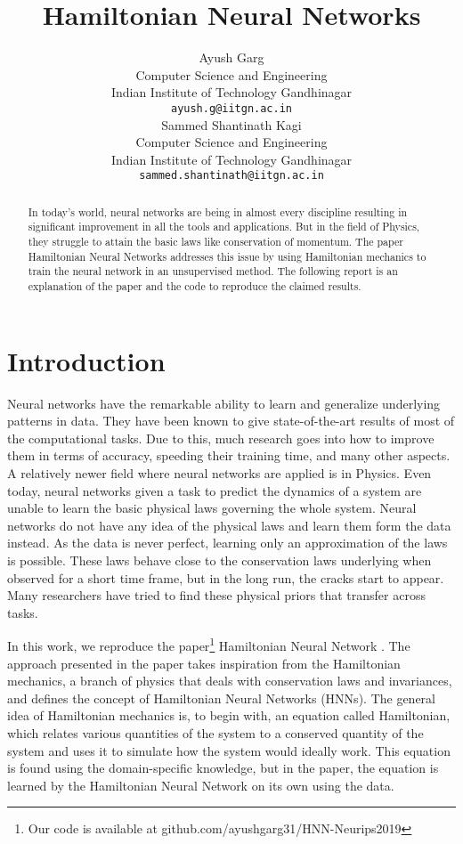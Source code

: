 \documentclass{article}
\title{Hamiltonian Neural Networks}
\author{%
  Ayush Garg \\
  Computer Science and Engineering\\
  Indian Institute of Technology Gandhinagar\\
  \texttt{ayush.g@iitgn.ac.in} \\
   \And
   Sammed Shantinath Kagi \\
   Computer Science and Engineering \\
   Indian Institute of Technology Gandhinagar\\
   \texttt{sammed.shantinath@iitgn.ac.in} \\
}
\begin{document}

\maketitle

\begin{abstract}
In today's world, neural networks are being in almost every discipline resulting in significant improvement in all the tools and applications. But in the field of Physics, they struggle to attain the basic laws like conservation of momentum. The paper Hamiltonian Neural Networks addresses this issue by using Hamiltonian mechanics to train the neural network in an unsupervised method. The following report is an explanation of the paper and the code to reproduce the claimed results.
\end{abstract}

\section{Introduction}
Neural networks have the remarkable ability to learn and generalize underlying patterns in data. They have been known to give state-of-the-art results of most of the computational tasks. Due to this, much research goes into how to improve them in terms of accuracy, speeding their training time, and many other aspects. A relatively newer field where neural networks are applied is in Physics. Even today, neural networks given a task to predict the dynamics of a system are unable to learn the basic physical laws governing the whole system. Neural networks do not have any idea of the physical laws and learn them form the data instead. As the data is never perfect, learning only an approximation of the laws is possible. These laws behave close to the conservation laws underlying when observed for a short time frame, but in the long run, the cracks start to appear. Many researchers have tried to find these physical priors that transfer across tasks.

In this work, we reproduce the paper\footnote{Our code is available at github.com/ayushgarg31/HNN-Neurips2019} Hamiltonian Neural Network \cite{greydanus}. The approach presented in the paper takes inspiration from the Hamiltonian mechanics, a branch of physics that deals with conservation laws and invariances, and defines the concept of Hamiltonian Neural Networks (HNNs). The general idea of Hamiltonian mechanics is, to begin with, an equation called Hamiltonian, which relates various quantities of the system to a conserved quantity of the system and uses it to simulate how the system would ideally work. This equation is found using the domain-specific knowledge, but in the paper, the equation is learned by the Hamiltonian Neural Network on its own using the data.
\end{document}
